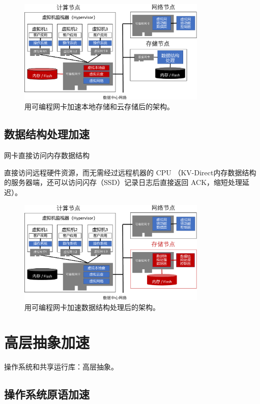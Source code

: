 \begin{figure}[htbp]
	\centering
	\includegraphics[width=0.8\textwidth]{figures/virt_storage.pdf}
	\caption{用可编程网卡加速本地存储和云存储后的架构。}
	\label{arch:fig:virt-storage}
\end{figure}

\subsection{数据结构处理加速}


网卡直接访问内存数据结构

直接访问远程硬件资源，而无需经过远程机器的 CPU （KV-Direct内存数据结构的服务器端，还可以访问闪存（SSD）记录日志后直接返回 ACK，缩短处理延迟）。

\begin{figure}[htbp]
	\centering
	\includegraphics[width=0.8\textwidth]{figures/data_structure_accel.pdf}
	\caption{用可编程网卡加速数据结构处理后的架构。}
	\label{arch:fig:data-structure-accel}
\end{figure}

\section{高层抽象加速}


操作系统和共享运行库：高层抽象。


\subsection{操作系统原语加速}

